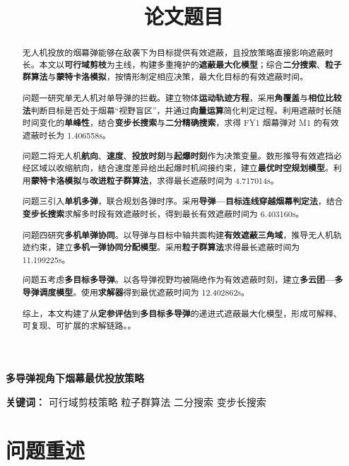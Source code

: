 \documentclass[12pt,a4paper]{ctexart}
\title{\textbf{论文题目}}
\author{}
\date{}
\numberwithin{equation}{section}
\begin{document}
\thispagestyle{empty}
\begin{center}
    \LARGE \textbf{多导弹视角下烟幕最优投放策略}
\end{center}
\vspace{1em}

\begin{abstract}
无人机投放的烟幕弹能够在敌袭下为目标提供有效遮蔽，且投放策略直接影响遮蔽时长。本文以\textbf{可行域剪枝}为主线，构建多重掩护的\textbf{遮蔽最大化模型}；综合\textbf{二分搜索}、\textbf{粒子群算法}与\textbf{蒙特卡洛模拟}，按情形制定相应决策，最大化目标的有效遮蔽时间。

问题一研究单无人机对单导弹的拦截。建立物体\textbf{运动轨迹方程}，采用\textbf{角覆盖}与\textbf{相位比较法}判断目标是否处于烟幕“视野盲区”，并通过\textbf{向量运算}简化判定过程。利用遮蔽时长随时间变化的\textbf{单峰性}，结合\textbf{变步长搜索}与\textbf{二分精确搜索}，求得 FY1 烟幕弹对 M1 的有效遮蔽时长为 1.406558s。

问题二将无人机\textbf{航向}、\textbf{速度}、\textbf{投放时刻}与\textbf{起爆时刻}作为决策变量。数形推导有效遮挡必经区域以收缩航向，结合速度差异给出起爆时机间接约束，建立\textbf{最优时空规划模型}。利用\textbf{蒙特卡洛模拟}与\textbf{改进粒子群算法}，求得最长遮蔽时间为 4.717014s。

问题三引入\textbf{单机多弹}，联合规划各弹时序。采用\textbf{导弹—目标连线穿越烟幕判定法}，结合\textbf{变步长搜索}求解多时段有效遮蔽时长，得到最长有效遮蔽时间为 6.403160s。

问题四研究\textbf{多机单弹协同}。以导弹与目标中轴共面构建\textbf{有效遮蔽三角域}，推导无人机轨迹约束，建立\textbf{多机一弹协同分配模型}。采用\textbf{粒子群算法}求得最长遮蔽时间为 11.199225s。

问题五考虑\textbf{多目标多导弹}。以各导弹视野均被隔绝作为有效遮蔽时刻，建立\textbf{多云团—多导弹调度模型}。使用\textbf{求解器}得到最优遮蔽时间为 12.402862s。

综上，本文构建了从\textbf{定参评估}到\textbf{多目标多导弹}的递进式遮蔽最大化模型，形成可解释、可复现、可扩展的求解链路。。
\end{abstract}
\vspace{1em}

\noindent\textbf{关键词：} 可行域剪枝策略 \quad  粒子群算法 \quad  二分搜索 \quad  变步长搜索

\newpage
\setcounter{page}{1}

\section{问题重述}
\end{document}
